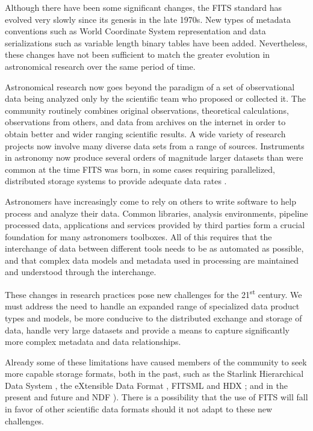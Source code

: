 \documentclass[final,authoryear,5p,times,twocolumn]{elsarticle}
\begin{document}
Although there have been some significant changes, the FITS standard
has evolved very slowly since its genesis in the late 1970s. New types
of metadata conventions such as World Coordinate System
\citep[WCS;][]{2002A&A...395.1061G,2002A&A...395.1077C,2006A&A...446..747G}
representation and data serializations such as variable length binary
tables \citep{1995A&AS..113..159C} have been added. Nevertheless,
these changes have not been sufficient to match the greater evolution
in astronomical research over the same period of time.


Astronomical research now goes beyond the paradigm of a set of
observational data being analyzed only by the scientific team who
proposed or collected it. The community routinely combines original
observations, theoretical calculations, observations from others, and
data from archives on the internet in order to obtain better and wider
ranging scientific results. A wide variety of research projects now involve many
diverse data sets from a range of sources. Instruments in astronomy
now produce several orders of magnitude larger datasets than were common
at the time FITS was born, in some cases requiring parallelized,
distributed storage systems to provide adequate data rates
\citep{2012ASPC..461..283A}.


Astronomers have increasingly come to rely on others to write software
to help process and analyze their data. Common libraries, analysis
environments, pipeline processed data, applications and services
provided by third parties form a crucial foundation for many
astronomers toolboxes. All of this requires that the interchange of
data between different tools needs to be as automated as possible, and
that complex data models and metadata used in processing are
maintained and understood through the interchange.


These changes in research practices pose new challenges for the
21\textsuperscript{st} century. We must address the need to handle an
expanded range of specialized data product types and models, be more
conducive to the distributed exchange and storage of data, handle very
large datasets and provide a means to capture significantly more complex
metadata and data relationships.


Already some of these limitations have caused members of the community
to seek more capable storage formats, both in the past, such as the
Starlink Hierarchical Data System \citep[HDS;][]{1982QJRAS..23..485D},
the eXtensible Data Format \citep[XDF;][]{2001ASPC..238..217S}, FITSML
\citep{2001ASPC..238..487T} and HDX \citep{2003ASPC..295..221G}; and
in the present and future
\citep[e.g. HDF5 ][]{2011ASPC..442...53A} and NDF \citep{P91_adassxxiii}).
There is a possibility that the use of FITS will fall in favor of other
scientific data formats should it not adapt to these new challenges.
\end{document}
